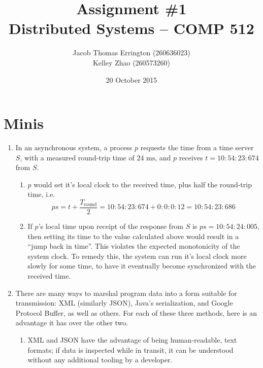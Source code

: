 \documentclass{article}
\author{Jacob Thomas Errington (260636023)\\Kelley Zhao (260573260)}
\title{Assignment \#1\\Distributed Systems -- COMP 512}
\date{20 October 2015}
\newcommand{\ms}{\text{ ms}}
\begin{document}
\maketitle

\section{Minis}

\begin{enumerate}
    \item
        In an asynchronous system, a process $p$ requests the time from a time
        server $S$, with a measured round-trip time of $24\ms$, and $p$
        receives $t = 10:54:23:674$ from $S$.

        \begin{enumerate}
            \item
                $p$ would set it's local clock to the received time, plus half
                the round-trip time, i.e.
                $$
                ps
                = t + \frac{T_\text{round}}{2}
                = 10 : 54 : 23 : 674 + 0 : 0 : 0 : 12
                = 10 : 54 : 23 : 686
                $$

            \item
                If $p$'s local time upon receipt of the response from $S$ is
                $ps = 10 : 54 : 24 : 005$, then setting its time to the value
                calculated above would result in a ``jump back in time''. This
                violates the expected monotonicity of the system clock. To
                remedy this, the system can run it's local clock more slowly
                for some time, to have it eventually become synchronized with
                the received time.
        \end{enumerate}

    \item
        There are many ways to marshal program data into a form suitable
        for transmission: XML (similarly JSON), Java's serialization, and
        Google Protocol Buffer, as well as others. For each of these three
        methods, here is an advantage it has over the other two.

        \begin{enumerate}
            \item
                XML and JSON have the advantage of being human-readable,
                text formats; if data is inspected while in transit, it can
                be understood without any additional tooling by a
                developer.


\end{enumerate}
\end{enumerate}
\end{document}
